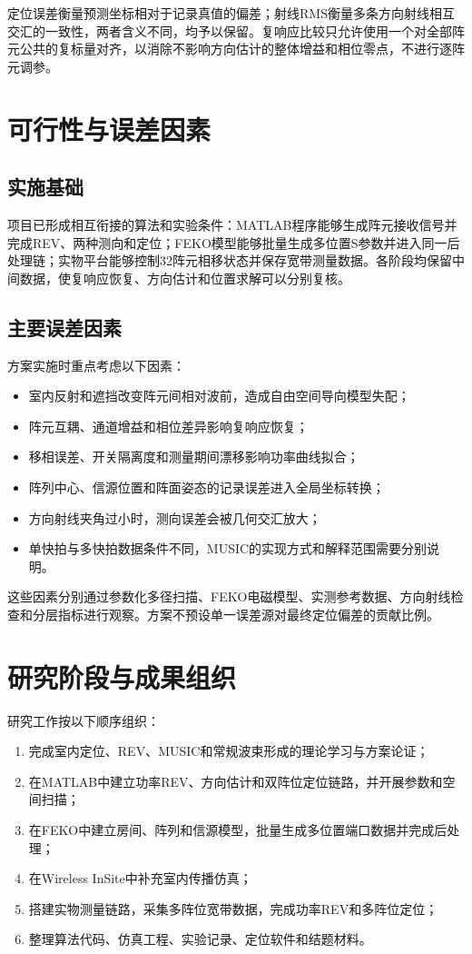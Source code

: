 \documentclass[UTF8,a4paper,12pt]{ctexart}
\begin{document}
定位误差衡量预测坐标相对于记录真值的偏差；射线RMS衡量多条方向射线相互交汇的一致性，两者含义不同，均予以保留。复响应比较只允许使用一个对全部阵元公共的复标量对齐，以消除不影响方向估计的整体增益和相位零点，不进行逐阵元调参。

\section{可行性与误差因素}

\subsection{实施基础}

项目已形成相互衔接的算法和实验条件：MATLAB程序能够生成阵元接收信号并完成REV、两种测向和定位；FEKO模型能够批量生成多位置S参数并进入同一后处理链；实物平台能够控制32阵元相移状态并保存宽带测量数据。各阶段均保留中间数据，使复响应恢复、方向估计和位置求解可以分别复核。

\subsection{主要误差因素}

方案实施时重点考虑以下因素：

\begin{itemize}
  \item 室内反射和遮挡改变阵元间相对波前，造成自由空间导向模型失配；
  \item 阵元互耦、通道增益和相位差异影响复响应恢复；
  \item 移相误差、开关隔离度和测量期间漂移影响功率曲线拟合；
  \item 阵列中心、信源位置和阵面姿态的记录误差进入全局坐标转换；
  \item 方向射线夹角过小时，测向误差会被几何交汇放大；
  \item 单快拍与多快拍数据条件不同，MUSIC的实现方式和解释范围需要分别说明。
\end{itemize}

这些因素分别通过参数化多径扫描、FEKO电磁模型、实测参考数据、方向射线检查和分层指标进行观察。方案不预设单一误差源对最终定位偏差的贡献比例。

\section{研究阶段与成果组织}

研究工作按以下顺序组织：

\begin{enumerate}
  \item 完成室内定位、REV、MUSIC和常规波束形成的理论学习与方案论证；
  \item 在MATLAB中建立功率REV、方向估计和双阵位定位链路，并开展参数和空间扫描；
  \item 在FEKO中建立房间、阵列和信源模型，批量生成多位置端口数据并完成后处理；
  \item 在Wireless InSite中补充室内传播仿真；
  \item 搭建实物测量链路，采集多阵位宽带数据，完成功率REV和多阵位定位；
  \item 整理算法代码、仿真工程、实验记录、定位软件和结题材料。
\end{enumerate}
\end{document}
